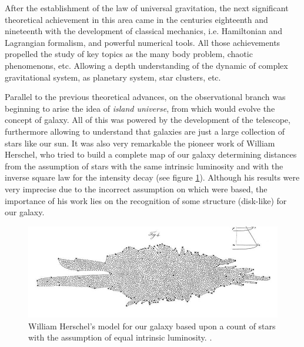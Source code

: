 After the establishment of the law of universal gravitation, the next 
significant theo\-retical achievement in this area came in the centuries 
eighteenth and nineteenth with the development of classical mechanics, i.e.
Hamiltonian and Lagrangian formalism, and powerful numerical tools. All
those achievements propelled the study of key topics as the many body 
problem, chaotic phenomenons, etc. Allowing a depth understanding of the 
dynamic of complex gravitational system, as planetary system, star 
clusters, etc. 


Parallel to the previous theoretical advances, on the observational branch 
was beginning to arise the idea of \textit{island universe}, from which 
would evolve the concept of galaxy. All of this was powered by the 
development of the telescope, furthermore allowing to understand that  
galaxies are just a large collection of stars like our sun. It was also 
very remarkable the pioneer work of William Herschel, who tried to build a
complete map of our galaxy determining distances from the assumption of 
stars with the same intrinsic luminosity and with the inverse square law 
for the intensity decay (see figure \ref{fig:HerschelModel}). 
Although his results were very imprecise due to the incorrect assumption 
on which were based, the importance of his work lies on the recognition of 
some structure (disk-like) for our galaxy. 


\begin{figure}[htbp]
	\centering
	\includegraphics[width=1.0\textwidth]
	{./figures/1_introduction/Herschel_Model.png}
	
	\caption{\small{William Herschel's model for our galaxy based upon a 
	count of stars with the assumption of equal intrinsic luminosity.
	\cite{Herschel1785}.}}
	
	\label{fig:HerschelModel}
\end{figure}
\newpage


